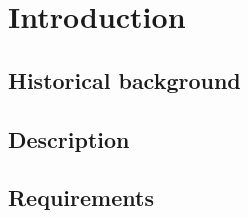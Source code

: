 \section{Introduction}

\subsection{Historical background}

\subsection{Description}

\subsection{Requirements}